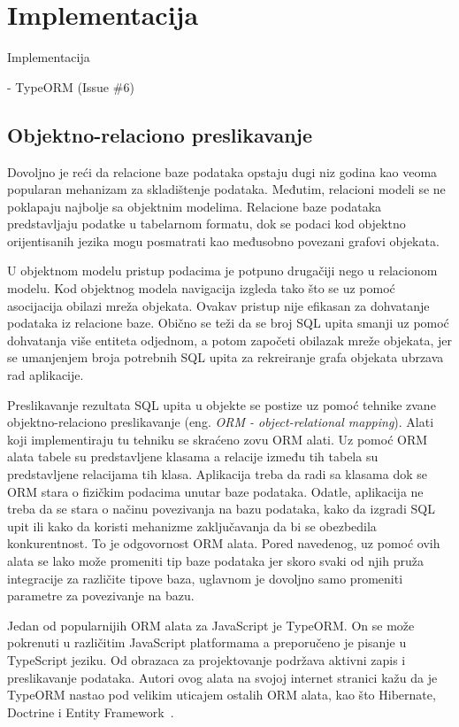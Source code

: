 \chapter{Implementacija}\label{ch:impl}

Implementacija

- TypeORM (Issue \#6)
\section{Objektno-relaciono preslikavanje}\label{sec:objektno-relaciono-preslikavanje}

Dovoljno je reći da relacione baze podataka opstaju dugi niz godina kao veoma popularan mehanizam za skladištenje
podataka. Međutim, relacioni modeli se ne poklapaju najbolje sa objektnim modelima. Relacione baze podataka
predstavljaju podatke u tabelarnom formatu, dok se podaci kod objektno orijentisanih jezika mogu posmatrati kao
međusobno povezani grafovi objekata.

U objektnom modelu pristup podacima je potpuno drugačiji nego u relacionom modelu. Kod objektnog modela navigacija
izgleda tako što se uz pomoć asocijacija obilazi mreža objekata. Ovakav pristup nije efikasan za dohvatanje podataka iz
relacione baze. Obično se teži da se broj SQL upita smanji uz pomoć dohvatanja više entiteta odjednom, a potom započeti
obilazak mreže objekata, jer se umanjenjem broja potrebnih SQL upita za rekreiranje grafa objekata ubrzava rad
aplikacije.

Preslikavanje rezultata SQL upita u objekte se postize uz pomoć tehnike zvane objektno-relaciono preslikavanje
(eng. \textit{ORM - object-relational mapping}). Alati koji implementiraju tu tehniku se skraćeno zovu ORM alati. Uz pomoć ORM alata
tabele su predstavljene klasama a relacije između tih tabela su predstavljene relacijama tih klasa. Aplikacija treba da
radi sa klasama dok se ORM stara o fizičkim podacima unutar baze podataka. Odatle, aplikacija ne treba da se stara o
načinu povezivanja na bazu podataka, kako da izgradi SQL upit ili kako da koristi mehanizme zaključavanja da bi se
obezbedila konkurentnost. To je odgovornost ORM alata. Pored navedenog, uz pomoć ovih alata se lako može promeniti tip
baze podataka jer skoro svaki od njih pruža integracije za različite tipove baza, uglavnom je dovoljno samo promeniti
parametre za povezivanje na bazu.

Jedan od popularnijih ORM alata za JavaScript je TypeORM. On se može pokrenuti u različitim JavaScript platformama a
preporučeno je pisanje u TypeScript jeziku. Od obrazaca za projektovanje podržava aktivni zapis i preslikavanje podataka.
Autori ovog alata na svojoj internet stranici kažu da je TypeORM nastao pod velikim uticajem ostalih ORM alata, kao što
Hibernate, Doctrine i Entity Framework~\cite{TypeORM}.


